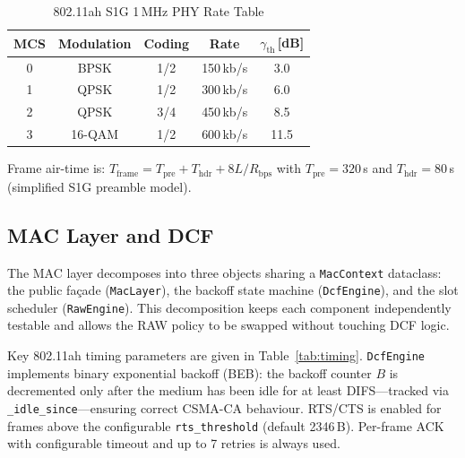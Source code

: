 \documentclass[conference]{IEEEtran}
\begin{document}
\begin{table}[!t]
\renewcommand{\arraystretch}{1.15}
\caption{802.11ah S1G 1\,MHz PHY Rate Table}
\label{tab:mcs}
\centering
\begin{tabular}{@{}ccccc@{}}
\toprule
\textbf{MCS} & \textbf{Modulation} & \textbf{Coding} &
\textbf{Rate} & $\gamma_\mathrm{th}$\,[dB] \\
\midrule
0 & BPSK   & 1/2 & 150\,kb/s & 3.0  \\
1 & QPSK   & 1/2 & 300\,kb/s & 6.0  \\
2 & QPSK   & 3/4 & 450\,kb/s & 8.5  \\
3 & 16-QAM & 1/2 & 600\,kb/s & 11.5 \\
\bottomrule
\end{tabular}
\end{table}

Frame air-time is:
$T_\mathrm{frame} = T_\mathrm{pre} + T_\mathrm{hdr} + 8L/R_\mathrm{bps}$
with $T_\mathrm{pre}{=}320$\,\textmu{}s and $T_\mathrm{hdr}{=}80$\,\textmu{}s
(simplified S1G preamble model).

\subsection{MAC Layer and DCF}

The MAC layer decomposes into three objects sharing a \texttt{MacContext}
dataclass: the public fa\c{c}ade (\texttt{MacLayer}), the backoff state
machine (\texttt{DcfEngine}), and the slot scheduler (\texttt{RawEngine}).
This decomposition keeps each component independently testable and allows
the RAW policy to be swapped without touching DCF logic.

Key 802.11ah timing parameters are given in Table~\ref{tab:timing}.
\texttt{DcfEngine} implements binary exponential backoff (BEB): the backoff
counter $B$ is decremented only after the medium has been idle for at least
DIFS---tracked via \texttt{\_idle\_since}---ensuring correct CSMA-CA
behaviour.
RTS/CTS is enabled for frames above the configurable \texttt{rts\_threshold}
(default 2346\,B).
Per-frame ACK with configurable timeout and up to 7 retries is always used.
\end{document}
